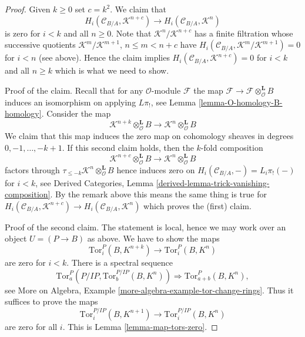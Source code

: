 \documentclass[10pt,a4paper]{amsart}
\theoremstyle{plain}
\theoremstyle{definition}
\theoremstyle{remark}
\numberwithin{equation}{subsection}
\begin{document}
\begin{proof}
\medskip\noindent
Given $k \geq 0$ set $c = k^2$. We claim that
$$
H_i(\mathcal{C}_{B/A}, \mathcal{K}^{n + c}) \to
H_i(\mathcal{C}_{B/A}, \mathcal{K}^n)
$$
is zero for $i < k$ and all $n \geq 0$. Note that
$\mathcal{K}^n/\mathcal{K}^{n + c}$ has a finite filtration whose successive
quotients $\mathcal{K}^m/\mathcal{K}^{m + 1}$, $n \leq m < n + c$
have $H_i(\mathcal{C}_{B/A}, \mathcal{K}^m/\mathcal{K}^{m + 1}) = 0$
for $i < n$ (see above). Hence the claim implies
$H_i(\mathcal{C}_{B/A}, \mathcal{K}^{n + c}) = 0$ for $i < k$ and all
$n \geq k$ which is what we need to show.

\medskip\noindent
Proof of the claim. Recall that for any $\mathcal{O}$-module $\mathcal{F}$
the map $\mathcal{F} \to \mathcal{F} \otimes_\mathcal{O}^\mathbf{L} B$
induces an isomorphism on applying $L\pi_!$, see
Lemma \ref{lemma-O-homology-B-homology}.
Consider the map
$$
\mathcal{K}^{n + k} \otimes_\mathcal{O}^\mathbf{L} B
\longrightarrow
\mathcal{K}^n \otimes_\mathcal{O}^\mathbf{L} B
$$
We claim that this map induces the zero map on cohomology sheaves
in degrees $0, -1, \ldots, - k + 1$. If this second claim holds, then
the $k$-fold composition
$$
\mathcal{K}^{n + c} \otimes_\mathcal{O}^\mathbf{L} B
\longrightarrow
\mathcal{K}^n \otimes_\mathcal{O}^\mathbf{L} B
$$
factors through $\tau_{\leq -k}\mathcal{K}^n \otimes_\mathcal{O}^\mathbf{L} B$
hence induces zero on $H_i(\mathcal{C}_{B/A}, -) = L_i\pi_!( - )$
for $i < k$, see
Derived Categories, Lemma \ref{derived-lemma-trick-vanishing-composition}.
By the remark above this means the same thing is true for
$H_i(\mathcal{C}_{B/A}, \mathcal{K}^{n + c}) \to
H_i(\mathcal{C}_{B/A}, \mathcal{K}^n)$
which proves the (first) claim.

\medskip\noindent
Proof of the second claim. The statement is local, hence we may work
over an object $U = (P \to B)$ as above. We have to show
the maps
$$
\text{Tor}_i^P(B, K^{n + k}) \to \text{Tor}_i^P(B, K^n)
$$
are zero for $i < k$. There is a spectral sequence
$$
\text{Tor}_a^P(P/IP, \text{Tor}_b^{P/IP}(B, K^n))
\Rightarrow
\text{Tor}_{a + b}^P(B, K^n),
$$
see More on Algebra, Example \ref{more-algebra-example-tor-change-rings}.
Thus it suffices to prove the maps
$$
\text{Tor}_i^{P/IP}(B, K^{n + 1}) \to \text{Tor}_i^{P/IP}(B, K^n)
$$
are zero for all $i$. This is Lemma \ref{lemma-map-tors-zero}.
\end{proof}



\end{document}

